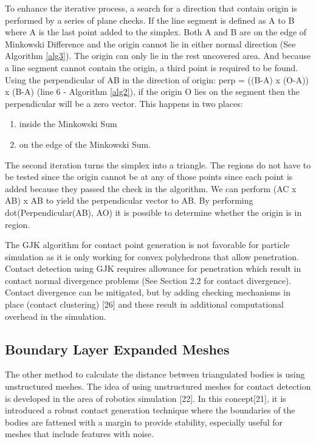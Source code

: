 \documentclass[times,12pt]{ACME2015article}
\begin{document}
To enhance the iterative process, a search for a direction that contain origin is performed by a series of plane checks. If the line segment is defined as A to B where A is the last point added to the simplex. Both A and B are on the edge of Minkowski Difference and the origin cannot lie in either normal direction (See Algorithm \ref{alg3}). The origin can only lie in the rest uncovered area. And because a line segment cannot contain the origin, a third point is required to be found. Using the perpendicular of AB in the direction of origin: perp = ((B-A) x (O-A)) x (B-A) (line 6 - Algorithm \ref{alg2}), if the origin O lies on the segment then the perpendicular will be a zero vector. This happens in two places:
\begin{enumerate}
\item inside the Minkowski Sum 
\item on the edge of the Minkowski Sum.
\end{enumerate} 
The second iteration turns the simplex into a triangle. The regions do not have to be tested since the origin cannot be at any of those points since each point is added because they passed the check in the algorithm. We can perform (AC x AB) x AB to yield the perpendicular vector to AB. By performing dot(Perpendicular(AB), AO) it is possible to determine whether the origin is in region. 

The GJK algorithm for contact point generation is not favorable for particle simulation as it is only working for convex polyhedrons that allow penetration. Contact detection using GJK requires allowance for penetration which result in contact normal divergence problems (See Section 2.2 for contact divergence). Contact divergence can be mitigated, but by adding checking mechanisms in place (contact clustering) [26] and these result in additional computational overhead in the simulation.


\subsection{Boundary Layer Expanded Meshes}
The other method to calculate the distance between triangulated bodies is using unstructured meshes. The idea of using unstructured meshes for contact detection is developed in the area of robotics simulation [22]. In this concept[21], it is introduced a robust contact generation technique where the boundaries of the bodies are fattened with a margin to provide stability, especially useful for meshes that include features with noise. 
\end{document}
